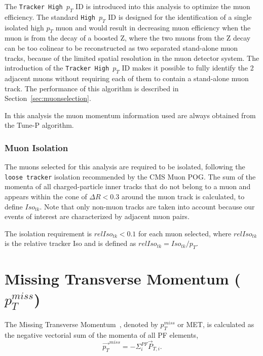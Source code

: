 The \texttt{Tracker High $p_T$} ID is introduced into this analysis to optimize the muon efficiency. The standard \texttt{High $p_T$} ID is designed for the identification of a single isolated high $p_T$ muon and would result in decreasing muon efficiency when the muon is from the decay of a boosted Z, where the two muons from the Z decay can be too colinear to be reconstructed as two separated stand-alone muon tracks, because of the limited spatial resolution in the muon detector system. The introduction of the \texttt{Tracker High $p_T$} ID makes it possible to fully identify the 2 adjacent muons without requiring each of them to contain a stand-alone muon track. The performance of this algorithm is described in Section~\ref{sec:muonselection}.

\vspace{0.3cm}
In this analysis the muon momentum information used are always obtained from the Tune-P algorithm.

\subsubsection{Muon Isolation}
The muons selected for this analysis are required to be isolated, following the \texttt{loose tracker} isolation recommended by the CMS Muon POG. The sum of the momenta of all charged-particle inner tracks that do not belong to a muon and appears within the cone of $\Delta R<0.3$ around the muon track is calculated, to define $Iso_{tk}$. Note that only non-muon tracks are taken into account because our events of interest are characterized by adjacent muon pairs.

\vspace{0.3cm}
The isolation requirement is $relIso_{tk}<0.1$ for each muon selected, where $relIso_{tk}$ is the relative tracker Iso and is defined as $relIso_{tk}=Iso_{tk}/p_{T}$.

\section{Missing Transverse Momentum ($p_T ^{miss}$)}
The Missing Transverse Momentum~\cite{ob_metconst}, denoted by $p_T ^{miss}$ or MET, is calculated as the negative vectorial sum of the momenta of all PF elements,
\begin{equation}
\vec{p_T} ^{miss} = -\Sigma_{i}^{PF} \vec{P}_{T,i}.
\label{eqn:ob_metdef}
\end{equation}

